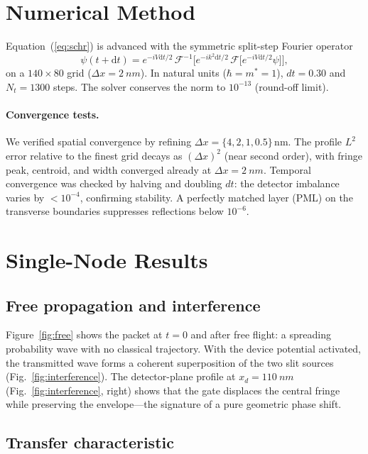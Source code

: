 \documentclass[11pt,a4paper]{article}
\newcommand{\dd}{\mathrm{d}}
\begin{document}
\section{Numerical Method}
\label{sec:numerics}

Equation~(\ref{eq:schr}) is advanced with the symmetric split-step Fourier 
operator
\begin{equation}
\psi(t+\dd t) = e^{-iV\dd t/2}\,\mathcal{F}^{-1}\!\Big[e^{-ik^2\dd t/2}\,
\mathcal{F}\big[e^{-iV\dd t/2}\psi\big]\Big],
\label{eq:split}
\end{equation}
on a $140\times80$ grid ($\Delta x=\SI{2}{nm}$). In natural units 
($\hbar=m^*=1$), $dt=0.30$ and $N_t=1300$ steps. The solver conserves the 
norm to $10^{-13}$ (round-off limit).

\paragraph{Convergence tests.} We verified spatial convergence by refining 
$\Delta x=\{4,2,1,0.5\}\,$nm. The profile $L^2$ error relative to the 
finest grid decays as $(\Delta x)^2$ (near second order), with fringe peak, 
centroid, and width converged already at $\Delta x=\SI{2}{nm}$. Temporal 
convergence was checked by halving and doubling $dt$: the detector imbalance 
varies by $<10^{-4}$, confirming stability. A perfectly matched layer (PML) 
on the transverse boundaries suppresses reflections below $10^{-6}$.

\section{Single-Node Results}
\label{sec:results}

\subsection{Free propagation and interference}
\label{sec:free}

Figure~\ref{fig:free} shows the packet at $t=0$ and after free flight: a 
spreading probability wave with no classical trajectory. With the device 
potential activated, the transmitted wave forms a coherent superposition of 
the two slit sources (Fig.~\ref{fig:interference}). The detector-plane profile 
at $x_d=\SI{110}{nm}$ (Fig.~\ref{fig:interference}, right) shows that the 
gate displaces the central fringe while preserving the envelope---the 
signature of a pure geometric phase shift.

\subsection{Transfer characteristic}
\label{sec:transfer}
\end{document}

